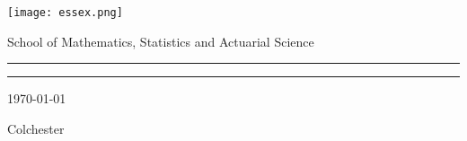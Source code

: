 \documentclass[12pt, a4paper,twoside]{report}
\numberwithin{equation}{chapter}
\begin{document}


\thispagestyle{empty} %

\noindent
    \begin{minipage}{0.1\textwidth}
    \texttt{[image: essex.png]}
    \end{minipage}
    \hfill
    \begin{minipage}{0.5\textwidth}
    \begin{center}
        \renewcommand\familydefault{\sfdefault}
        \selectfont
        {\large School of Mathematics, Statistics and Actuarial Science}
    \end{center}
    \end{minipage}

\begin{center}
    \noindent\textcolor{myred}{\rule{\linewidth}{4.8pt}}
    
    \vspace{2em}
    
    \vspace{3em}
    
    \vspace{3em}
    
    \vspace{3em}
    
    \vfill
    
    \vspace{0.5em}
    \noindent\textcolor{myred}{\rule{\linewidth}{4.8pt}}
    
    \vspace{2em}
    {\Large \today }
    
    {\Large Colchester}
\end{center}

\clearpage


\tableofcontents


\end{document}
